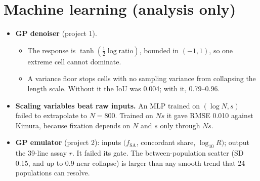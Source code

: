 \section{Machine learning (analysis only)}
\begin{itemize}
\item \textbf{GP denoiser} (project 1).
  \begin{itemize}
  \item The response is $\tanh(\tfrac12\log\text{ratio})$, bounded in $(-1,1)$, so one extreme cell cannot dominate.
  \item A variance floor stops cells with no sampling variance from collapsing the length scale. Without it the IoU was 0.004; with it, 0.79--0.96.
  \end{itemize}
\item \textbf{Scaling variables beat raw inputs.} An MLP trained on $(\log N,s)$ failed to extrapolate to $N=800$. Trained on $Ns$ it gave RMSE 0.010 against Kimura, because fixation depends on $N$ and $s$ only through $Ns$.
\item \textbf{GP emulator} (project 2): inputs $(f_\mathrm{SA}$, concordant share, $\log_{10}R)$; output the 39-line assay $r$. It failed its gate. The between-population scatter (SD 0.15, and up to 0.9 near collapse) is larger than any smooth trend that 24 populations can resolve.
\end{itemize}
